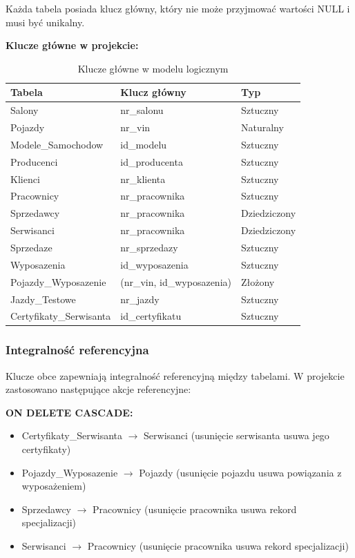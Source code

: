 \documentclass[a4paper,titleauthor]{mwart}
\begin{document}
	Każda tabela posiada klucz główny, który nie może przyjmować wartości NULL i musi być unikalny.

	\textbf{Klucze główne w projekcie:}

	\begin{table}[H]
		\centering
		\begin{tabular}{|l|l|l|}
			\hline
			\textbf{Tabela} & \textbf{Klucz główny} & \textbf{Typ} \\
			\hline
			Salony & nr\_salonu & Sztuczny \\
			\hline
			Pojazdy & nr\_vin & Naturalny \\
			\hline
			Modele\_Samochodow & id\_modelu & Sztuczny \\
			\hline
			Producenci & id\_producenta & Sztuczny \\
			\hline
			Klienci & nr\_klienta & Sztuczny \\
			\hline
			Pracownicy & nr\_pracownika & Sztuczny \\
			\hline
			Sprzedawcy & nr\_pracownika & Dziedziczony \\
			\hline
			Serwisanci & nr\_pracownika & Dziedziczony \\
			\hline
			Sprzedaze & nr\_sprzedazy & Sztuczny \\
			\hline
			Wyposazenia & id\_wyposazenia & Sztuczny \\
			\hline
			Pojazdy\_Wyposazenie & (nr\_vin, id\_wyposazenia) & Złożony \\
			\hline
			Jazdy\_Testowe & nr\_jazdy & Sztuczny \\
			\hline
			Certyfikaty\_Serwisanta & id\_certyfikatu & Sztuczny \\
			\hline
		\end{tabular}
		\caption{Klucze główne w modelu logicznym}
	\end{table}

	\subsubsection{Integralność referencyjna}

	Klucze obce zapewniają integralność referencyjną między tabelami. W projekcie zastosowano następujące akcje referencyjne:

	\textbf{ON DELETE CASCADE:}
	\begin{itemize}
		\item Certyfikaty\_Serwisanta $\rightarrow$ Serwisanci (usunięcie serwisanta usuwa jego certyfikaty)
		\item Pojazdy\_Wyposazenie $\rightarrow$ Pojazdy (usunięcie pojazdu usuwa powiązania z wyposażeniem)
		\item Sprzedawcy $\rightarrow$ Pracownicy (usunięcie pracownika usuwa rekord specjalizacji)
		\item Serwisanci $\rightarrow$ Pracownicy (usunięcie pracownika usuwa rekord specjalizacji)
	\end{itemize}
\end{document}
